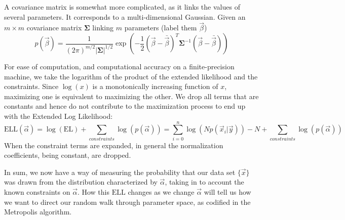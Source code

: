 A covariance matrix is somewhat more complicated, as it links the
values of several parameters.  It corresponds to a multi-dimensional
Gaussian.  Given an $m \times m$ covariance matrix $\mathbf{\Sigma}$
linking $m$ parameters (label them $\vec{\beta}$)
\begin{equation}
p(\vec{\beta}) = \frac{1}{(2 \pi)^{m/2} |\mathbf{\Sigma}|^{1/2}}
  \exp\left(-\frac{1}{2} (\vec{\beta}-\bar{\vec{\beta}})^T
  \mathbf{\Sigma}^{-1} (\vec{\beta}-\bar{\vec{\beta}})\right)
\end{equation}

For ease of computation, and computational accuracy on a
finite-precision machine, we take the logarithm of the product of the
extended likelihood and the constraints.  Since $\log(x)$ is a
monotonically increasing function of $x$, maximizing one is equivalent
to maximizing the other.  We drop all terms that are constants and
hence do not contribute to the maximization process to end up with the
Extended Log Likelihood:
\begin{equation}
\mathrm{ELL}(\vec{\alpha}) = \log(\mathrm{EL}) + \sum_{constraints}
\log(p(\vec{\alpha})) = \sum_{i=0}^{n} \log(N p(\vec{x}_i | \vec{y}))
- N + \sum_{constraints} \log(p(\vec{\alpha}))
\end{equation}
When the constraint terms are expanded, in general the normalization
coefficients, being constant, are dropped.

In sum, we now have a way of measuring the probability that our data
set $\{\vec{x}\}$ was drawn from the distribution characterized by
$\vec{\alpha}$, taking in to account the known constraints on
$\vec{\alpha}$.  How this $\mathrm{ELL}$ changes as we change
$\vec{\alpha}$ will tell us how we want to direct our random walk
through parameter space, as codified in the Metropolis algorithm.

